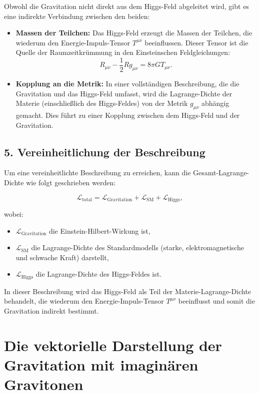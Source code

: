 \documentclass{article}
\begin{document}
Obwohl die Gravitation nicht direkt aus dem Higgs-Feld abgeleitet wird, gibt es eine indirekte Verbindung zwischen den beiden:

\begin{itemize}
	\item \textbf{Massen der Teilchen:} Das Higgs-Feld erzeugt die Massen der Teilchen, die wiederum den Energie-Impuls-Tensor $T^{\mu\nu}$ beeinflussen. Dieser Tensor ist die Quelle der Raumzeitkrümmung in den Einsteinschen Feldgleichungen:
	\[
	R_{\mu\nu} - \frac{1}{2} R g_{\mu\nu} = 8\pi G T_{\mu\nu}.
	\]
	\item \textbf{Kopplung an die Metrik:} In einer vollständigen Beschreibung, die die Gravitation und das Higgs-Feld umfasst, wird die Lagrange-Dichte der Materie (einschließlich des Higgs-Feldes) von der Metrik $g_{\mu\nu}$ abhängig gemacht. Dies führt zu einer Kopplung zwischen dem Higgs-Feld und der Gravitation.
\end{itemize}

\subsection{5. Vereinheitlichung der Beschreibung}

Um eine vereinheitlichte Beschreibung zu erreichen, kann die Gesamt-Lagrange-Dichte wie folgt geschrieben werden:

\[
\mathcal{L}_\text{total} = \mathcal{L}_\text{Gravitation} + \mathcal{L}_\text{SM} + \mathcal{L}_\text{Higgs},
\]

wobei:

\begin{itemize}
	\item $\mathcal{L}_\text{Gravitation}$ die Einstein-Hilbert-Wirkung ist,
	\item $\mathcal{L}_\text{SM}$ die Lagrange-Dichte des Standardmodells (starke, elektromagnetische und schwache Kraft) darstellt,
	\item $\mathcal{L}_\text{Higgs}$ die Lagrange-Dichte des Higgs-Feldes ist.
\end{itemize}

In dieser Beschreibung wird das Higgs-Feld als Teil der Materie-Lagrange-Dichte behandelt, die wiederum den Energie-Impuls-Tensor $T^{\mu\nu}$ beeinflusst und somit die Gravitation indirekt bestimmt.
\section{Die vektorielle Darstellung der Gravitation mit imaginären Gravitonen}
\end{document}
